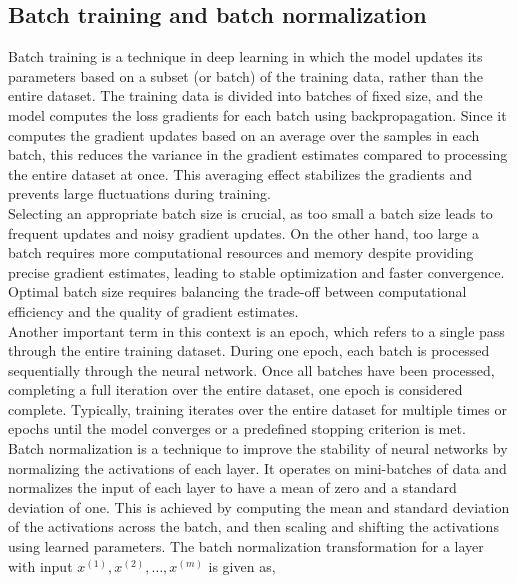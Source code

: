 \subsection{Batch training and batch normalization}
Batch training is a technique in deep learning in which the model updates its parameters based on a subset (or batch) of the training data, rather than the entire dataset. The training data is divided into batches of fixed size, and the model computes the loss gradients for each batch using backpropagation. Since it computes the gradient updates based on an average over the samples in each batch, this reduces the variance in the gradient estimates compared to processing the entire dataset at once. This averaging effect stabilizes the gradients and prevents large fluctuations during training. \\
Selecting an appropriate batch size is crucial, as too small a batch size leads to frequent updates and noisy gradient updates. On the other hand, too large a batch requires more computational resources and memory despite providing precise gradient estimates, leading to stable optimization and faster convergence. Optimal batch size requires balancing the trade-off between computational efficiency and the quality of gradient estimates. \\                     
Another important term in this context is an epoch, which refers to a single pass through the entire training dataset. During one epoch, each batch is processed sequentially through the neural network. Once all batches have been processed, completing a full iteration over the entire dataset, one epoch is considered complete. Typically, training iterates over the entire dataset for multiple times or epochs until the model converges or a predefined stopping criterion is met. \\
Batch normalization \cite{batchnorm} is a technique to improve the stability of neural networks by normalizing the activations of each layer. It operates on mini-batches of data and normalizes the input of each layer to have a mean of zero and a standard deviation of one. This is achieved by computing the mean and standard deviation of the activations across the batch, and then scaling and shifting the activations using learned parameters. The batch normalization transformation for a layer with input $x^{(1)}, x^{(2)}, \ldots, x^{(m)}$ is given as,
